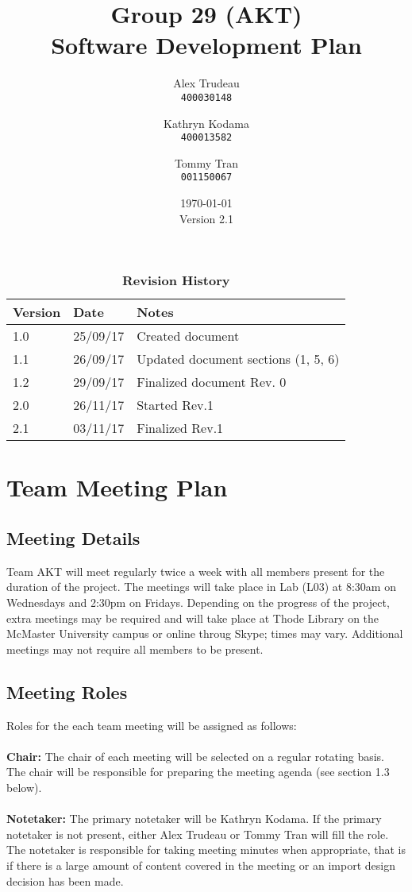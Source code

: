 \documentclass[12pt,fleqn]{article}
\title{Group 29 (AKT)\\ Software Development Plan}
\author{
Alex Trudeau\\
	\texttt{400030148}
\and
Kathryn Kodama\\
  	\texttt{400013582}
\and
Tommy Tran\\
	\texttt{001150067}
}
\date{\today\\Version 2.1}
\begin{document}
\maketitle

\pagebreak

\tableofcontents

\begin{table}[ht]
\caption{\bf Revision History}
\begin{tabularx}{\textwidth}{p{3cm}p{2cm}X}

\toprule {\bf Version} & {\bf Date} & {\bf Notes}\\
\midrule
1.0 & 25/09/17 & Created document \\
1.1 & 26/09/17 & Updated document sections (1, 5, 6) \\
1.2 & 29/09/17 & Finalized document Rev. 0 \\
\leavevmode\color{red}2.0 & \leavevmode\color{red}26/11/17 & \leavevmode\color{red}Started Rev.1 \\
\leavevmode\color{red}2.1 & \leavevmode\color{red}03/11/17 & \leavevmode\color{red}Finalized Rev.1 \\
\bottomrule
\end{tabularx}
\end{table}


\clearpage

\section{Team Meeting Plan}

\subsection{Meeting Details}

Team AKT will meet regularly twice a week with all members present for the duration of the project.  The meetings will take place in Lab (L03) at 8:30am on Wednesdays and 2:30pm on Fridays.  Depending on the progress of the project, extra meetings may be required and will take place at Thode Library on the McMaster University campus or online throug Skype; times may vary.  Additional meetings may not require all members to be present.

\subsection{Meeting Roles}
Roles for the each team meeting will be assigned as follows:\\ \\
\textbf{Chair:} The chair of each meeting will be selected on a regular rotating basis.  The chair will be responsible for preparing the meeting agenda (see section 1.3 below).\\ \\
\textbf{Notetaker:} The primary notetaker will be Kathryn Kodama.  If the primary notetaker is not present, either Alex Trudeau or Tommy Tran will fill the role.  The notetaker is responsible for taking meeting minutes when appropriate, that is if there is a large amount of content covered in the meeting or an import design decision has been made.  
\end{document}
